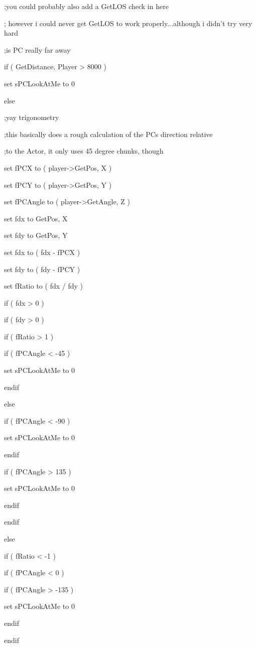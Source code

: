 \documentclass[
]{article}
\begin{document}
;you could probably also add a GetLOS check in here

; however i could never get GetLOS to work properly...although i didn't
try very hard

;is PC really far away

if ( GetDistance, Player \textgreater{} 8000 )

set sPCLookAtMe to 0

else

;yay trigonometry

;this basically does a rough calculation of the PCs direction relative

;to the Actor, it only uses 45 degree chunks, though

set fPCX to ( player-\textgreater GetPos, X )

set fPCY to ( player-\textgreater GetPos, Y )

set fPCAngle to ( player-\textgreater GetAngle, Z )

set fdx to GetPos, X

set fdy to GetPos, Y

set fdx to ( fdx - fPCX )

set fdy to ( fdy - fPCY )

set fRatio to ( fdx / fdy )

if ( fdx \textgreater{} 0 )

if ( fdy \textgreater{} 0 )

if ( fRatio \textgreater{} 1 )

if ( fPCAngle \textless{} -45 )

set sPCLookAtMe to 0

endif

else

if ( fPCAngle \textless{} -90 )

set sPCLookAtMe to 0

endif

if ( fPCAngle \textgreater{} 135 )

set sPCLookAtMe to 0

endif

endif

else

if ( fRatio \textless{} -1 )

if ( fPCAngle \textless{} 0 )

if ( fPCAngle \textgreater{} -135 )

set sPCLookAtMe to 0

endif

endif
\end{document}
